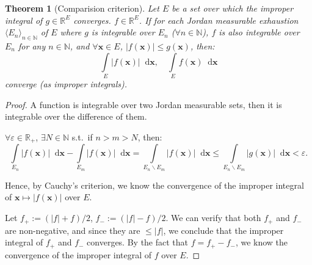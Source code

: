 \documentclass[openany]{book}
\theoremstyle{plain}
\newtheorem{theorem}{Theorem}[section] %
\theoremstyle{definition}
\newcommand{\dif}{\mathop{}\!\mathrm{d}} %
\newcommand*{\bv}{\boldsymbol} %
\begin{document}
\begin{theorem}[Comparision criterion]
	\label{theorem: comparision criterion (improper integral)}
	Let $E$ be a set over which the improper integral of $g \in \mathbb R^E$ converges. 
	$f \in \mathbb R^E$.
	If for each Jordan measurable exhaustion $\langle E_n \rangle_{n \in \mathbb N}$ of $E$ where $g$ is integrable over $E_n$ ($\forall n \in \mathbb N$), $f$ is also integrable over $E_n$ for any $n \in \mathbb N$, and $\forall \bv x \in E$, $|f(\bv x)| \leq g(\bv x)$, then:
	\begin{equation*}
		\int\limits_{E} |f(\bv x)| \dif \bv x, \quad \int\limits_{E} f(\bv x) \dif \bv x
	\end{equation*}
	converge (as improper integrals).
\end{theorem}
\begin{proof}
	A function is integrable over two Jordan measurable sets, then it is integrable over the difference of them.

	$\forall \varepsilon \in \mathbb R_+$, $\exists N \in \mathbb N$ s.t.\ if $n > m > N$, then:
	\begin{equation*}
		\int\limits_{E_n} |f(\bv x)| \dif \bv x - \int\limits_{E_m} |f(\bv x)| \dif \bv x = \int\limits_{E_n \backslash E_m} |f(\bv x)| \dif \bv x
		\leq \int\limits_{E_n \backslash E_m} |g(\bv x)| \dif \bv x < \varepsilon.
	\end{equation*}

	Hence, by Cauchy's criterion, we know the convergence of the improper integral of $\bv x \mapsto |f(\bv x)|$ over $E$.

	Let $f_+ := (|f| + f)/2$, $f_- := (|f| - f)/2$. 
	We can verify that both $f_+$ and $f_-$ are non-negative, and since they are $\leq |f|$, we conclude that the improper integral of $f_+$ and $f_-$ converges. 
	By the fact that $f = f_+ - f_-$, we know the convergence of the improper integral of $f$ over $E$.
\end{proof}
\end{document}

